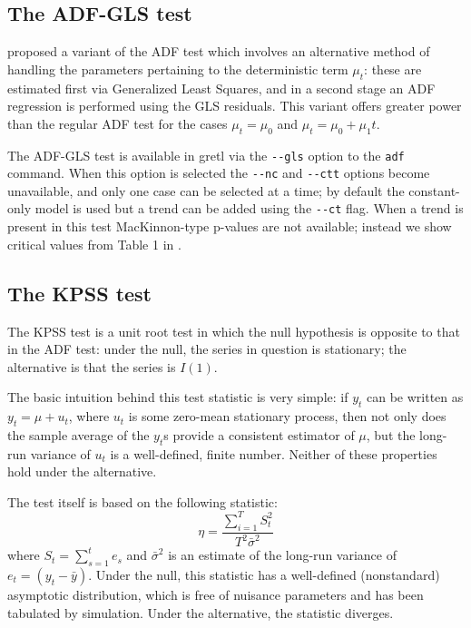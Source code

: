 \subsection{The ADF-GLS test}
\label{sec:ADF-GLS}

\citet*{ERS96} proposed a variant of the ADF test which involves an
alternative method of handling the parameters pertaining to the
deterministic term $\mu_t$: these are estimated first via Generalized
Least Squares, and in a second stage an ADF regression is performed
using the GLS residuals. This variant offers greater power than the
regular ADF test for the cases $\mu_t = \mu_0$ and $\mu_t = \mu_0 +
\mu_1 t$. 

The ADF-GLS test is available in gretl via the \verb|--gls|
option to the \texttt{adf} command. When this option is selected the
\verb|--nc| and \verb|--ctt| options become unavailable, and only one
case can be selected at a time; by default the constant-only model is
used but a trend can be added using the \verb|--ct| flag.  When a
trend is present in this test MacKinnon-type p-values are not
available; instead we show critical values from Table 1 in
\cite{ERS96}.


\subsection{The KPSS test}
\label{sec:KPSStest}

The KPSS test \citep*{KPSS92} is a unit root test in which the null
hypothesis is opposite to that in the ADF test: under the null, the
series in question is stationary; the alternative is that the series
is $I(1)$.

The basic intuition behind this test statistic is very simple: if
$y_t$ can be written as $y_t = \mu + u_t$, where $u_t$ is some
zero-mean stationary process, then not only does the sample average of
the $y_t$s provide a consistent estimator of $\mu$, but the long-run
variance of $u_t$ is a well-defined, finite number. Neither of these
properties hold under the alternative.

The test itself is based on the following statistic:
\begin{equation}
  \label{eq:KPSStest}
  \eta = \frac{\sum_{i=1}^T S_t^2 }{ T^2 \bar{\sigma}^2 }
\end{equation}
where $S_t = \sum_{s=1}^t e_s$ and $\bar{\sigma}^2$ is an estimate of
the long-run variance of $e_t = (y_t - \bar{y})$. Under the null, this
statistic has a well-defined (nonstandard) asymptotic distribution,
which is free of nuisance parameters and has been tabulated by
simulation. Under the alternative, the statistic diverges.

